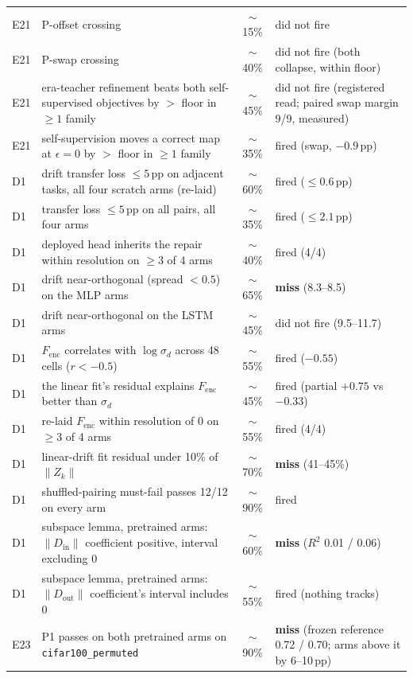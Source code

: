 \begin{center}
\begin{tabular}{@{}llcl@{}}
E21 & P-offset crossing & $\sim$15\% & did not fire \\
E21 & P-swap crossing & $\sim$40\% & did not fire (both collapse, within floor) \\
E21 & era-teacher refinement beats both self-supervised objectives by $>$ floor in $\ge 1$ family & $\sim$45\% & did not fire (registered read; paired swap margin 9/9, measured) \\
E21 & self-supervision moves a correct map at $\epsilon=0$ by $>$ floor in $\ge 1$ family & $\sim$35\% & fired (swap, $-0.9$\,pp) \\
D1 & drift transfer loss $\le 5$\,pp on adjacent tasks, all four scratch arms (re-laid) & $\sim$60\% & fired ($\le 0.6$\,pp) \\
D1 & transfer loss $\le 5$\,pp on all pairs, all four arms & $\sim$35\% & fired ($\le 2.1$\,pp) \\
D1 & deployed head inherits the repair within resolution on $\ge 3$ of 4 arms & $\sim$40\% & fired (4/4) \\
D1 & drift near-orthogonal (spread $< 0.5$) on the MLP arms & $\sim$65\% & \textbf{miss} (8.3--8.5) \\
D1 & drift near-orthogonal on the LSTM arms & $\sim$45\% & did not fire (9.5--11.7) \\
D1 & $F_{\mathrm{enc}}$ correlates with $\log\sigma_d$ across 48 cells ($r < -0.5$) & $\sim$55\% & fired ($-0.55$) \\
D1 & the linear fit's residual explains $F_{\mathrm{enc}}$ better than $\sigma_d$ & $\sim$45\% & fired (partial $+0.75$ vs $-0.33$) \\
D1 & re-laid $F_{\mathrm{enc}}$ within resolution of 0 on $\ge 3$ of 4 arms & $\sim$55\% & fired (4/4) \\
D1 & linear-drift fit residual under 10\% of $\|Z_k\|$ & $\sim$70\% & \textbf{miss} (41--45\%) \\
D1 & shuffled-pairing must-fail passes 12/12 on every arm & $\sim$90\% & fired \\
D1 & subspace lemma, pretrained arms: $\|D_{\mathrm{in}}\|$ coefficient positive, interval excluding 0 & $\sim$60\% & \textbf{miss} ($R^2$ 0.01 / 0.06) \\
D1 & subspace lemma, pretrained arms: $\|D_{\mathrm{out}}\|$ coefficient's interval includes 0 & $\sim$55\% & fired (nothing tracks) \\
E23 & P1 passes on both pretrained arms on \texttt{cifar100\_permuted} & $\sim$90\% & \textbf{miss} (frozen reference 0.72 / 0.70; arms above it by 6--10\,pp) \\

\end{tabular}
\end{center}
